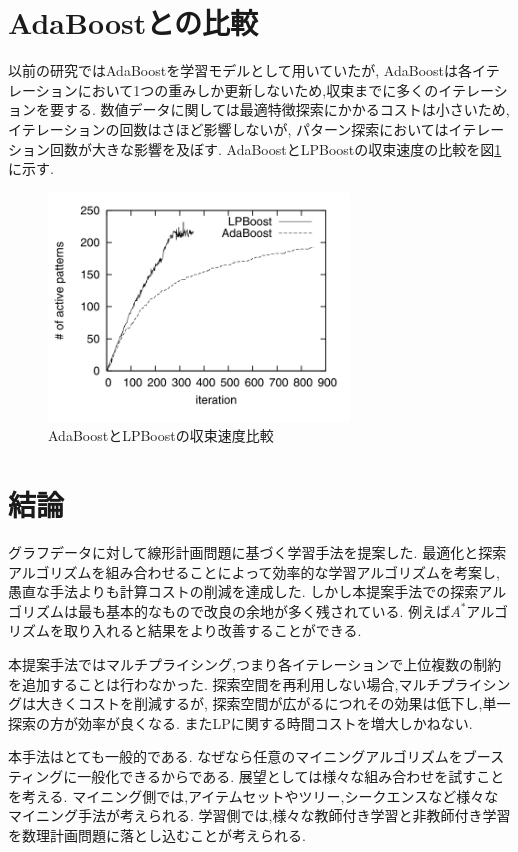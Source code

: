 \documentclass{zasshi-prml3}
\theoremstyle{definition}
\begin{document}
{\section{AdaBoostとの比較}
以前の研究ではAdaBoostを学習モデルとして用いていたが,
AdaBoostは各イテレーションにおいて1つの重みしか更新しないため,収束までに多くのイテレーションを要する.
数値データに関しては最適特徴探索にかかるコストは小さいため,イテレーションの回数はさほど影響しないが,
パターン探索においてはイテレーション回数が大きな影響を及ぼす.
AdaBoostとLPBoostの収束速度の比較を図\ref{compare_adaboost}に示す.
\begin{figure}[t]
	\centering
	\includegraphics[width=80mm]{figure/compare_adaboost.png}
	\caption{AdaBoostとLPBoostの収束速度比較}
	\label{compare_adaboost}
\end{figure}

\section{結論}
グラフデータに対して線形計画問題に基づく学習手法を提案した.
最適化と探索アルゴリズムを組み合わせることによって効率的な学習アルゴリズムを考案し,
愚直な手法よりも計算コストの削減を達成した.
しかし本提案手法での探索アルゴリズムは最も基本的なもので改良の余地が多く残されている.
例えば$A^*$アルゴリズムを取り入れると結果をより改善することができる.

本提案手法ではマルチプライシング,つまり各イテレーションで上位複数の制約を追加することは行わなかった.
探索空間を再利用しない場合,マルチプライシングは大きくコストを削減するが,
探索空間が広がるにつれその効果は低下し,単一探索の方が効率が良くなる.
またLPに関する時間コストを増大しかねない.

本手法はとても一般的である.
なぜなら任意のマイニングアルゴリズムをブースティングに一般化できるからである.
展望としては様々な組み合わせを試すことを考える.
マイニング側では,アイテムセットやツリー,シークエンスなど様々なマイニング手法が考えられる.
学習側では,様々な教師付き学習と非教師付き学習を数理計画問題に落とし込むことが考えられる.


}
\end{document}
